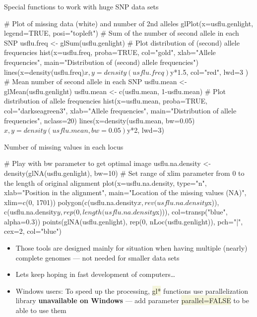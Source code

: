 \documentclass[compress, ucs, xelatex, 11pt, xcolor=svgnames, aspectratio=169,
	hyperref={
		bookmarks=true,
		unicode=true,
		colorlinks=true,
		pdftitle={Molecular data in R},
		plainpages=false,
		pdfauthor={Vojtech Zeisek},
		pdfsubject={Course about phylogeny and evolution in R},
		pdfcreator={XeLaTeX},
		pdfkeywords={R, evolution, phylogeny, molecular data},
		linkcolor=Crimson, %
		anchorcolor=Magenta, %
		citecolor=Magenta, %
		filecolor=Magenta, %
		menucolor=Magenta, %
		urlcolor=DodgerBlue, %
		pdftex},
	url={hyphens, lowtilde} %
	]{beamer}
\renewcommand{\texttt}[1]{\colorbox{Beige}{{\ttfamily #1}}}
\begin{document}
\begin{frame}[fragile]{Special functions to work with huge SNP data sets}
	\begin{spluscode}
    # Plot of missing data (white) and number of 2nd alleles
    glPlot(x=usflu.genlight, legend=TRUE, posi="topleft")
    # Sum of the number of second allele in each SNP
    usflu.freq <- glSum(usflu.genlight)
    # Plot distribution of (second) allele frequencies
    hist(x=usflu.freq, proba=TRUE, col="gold", xlab="Allele frequencies",
      main="Distribution of (second) allele frequencies")
    lines(x=density(usflu.freq)$x, y=density(usflu.freq)$y*1.5, col="red",
      lwd=3 )
    # Mean number of second allele in each SNP
    usflu.mean <- glMean(usflu.genlight)
    usflu.mean <- c(usflu.mean, 1-usflu.mean)
    # Plot distribution of allele frequencies
    hist(x=usflu.mean, proba=TRUE, col="darkseagreen3", xlab="Allele
      frequencies", main="Distribution of allele frequencies", nclass=20)
    lines(x=density(usflu.mean, bw=0.05)$x, y=density(usflu.mean, bw=0.05)$y*2,
      lwd=3)
	\end{spluscode}
\end{frame}

\begin{frame}[fragile]{Number of missing values in each locus}
	\begin{spluscode}
    # Play with bw parameter to get optimal image
    usflu.na.density <- density(glNA(usflu.genlight), bw=10)
    # Set range of xlim parameter from 0 to the length of original alignment
    plot(x=usflu.na.density, type="n", xlab="Position in the alignment",
      main="Location of the missing values (NA)", xlim=c(0, 1701))
    polygon(c(usflu.na.density$x, rev(usflu.na.density$x)),
      c(usflu.na.density$y, rep(0, length(usflu.na.density$x))),
      col=transp("blue", alpha=0.3))
    points(glNA(usflu.genlight), rep(0, nLoc(usflu.genlight)), pch="|", cex=2,
      col="blue")
	\end{spluscode}
	\begin{itemize}
		\item Those tools are designed mainly for situation when having multiple (nearly) complete genomes --- not needed for smaller data sets
		\item Lets keep hoping in fast development of computers\ldots
		\item \alert{Windows users:} To speed up the processing, \texttt{gl*} functions use parallelization library \textbf{unavailable on Windows} --- add parameter \texttt{parallel=FALSE} to be able to use them
	\end{itemize}
\end{frame}
\end{document}
